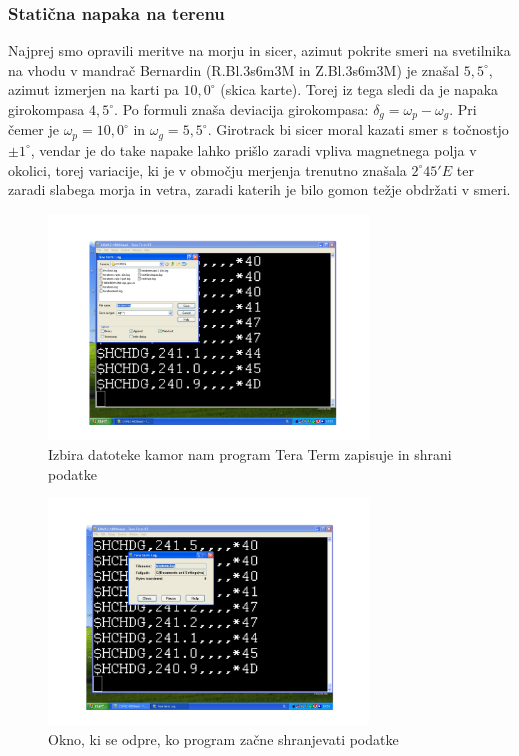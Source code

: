 \subsubsection{Statična napaka na terenu}
Najprej smo opravili meritve na morju in sicer, azimut pokrite smeri na svetilnika na vhodu v mandrač Bernardin (R.Bl.3s6m3M in Z.Bl.3s6m3M) je znašal $5,5^{\circ}$, azimut izmerjen na karti pa $10,0^{\circ}$ (skica karte). Torej iz tega sledi da je napaka girokompasa $4,5^{\circ}$. Po formuli znaša deviacija girokompasa: $\delta_g = \omega_p - \omega_g$. Pri čemer je $\omega_p = 10,0^{\circ}$ in $\omega_g = 5,5^{\circ}$.
Girotrack bi sicer moral kazati smer s točnostjo $\pm 1^{\circ}$, vendar je do take napake lahko prišlo zaradi vpliva magnetnega polja v okolici, torej variacije, ki je v območju merjenja trenutno znašala $2^{\circ}45'E$ ter zaradi slabega morja in vetra, zaradi katerih je bilo gomon težje obdržati v smeri.

\begin{figure}
	\centering
	\includegraphics[height=6cm]{IzbiraDatoteke}
	\caption{Izbira datoteke kamor nam program Tera Term zapisuje in shrani podatke}
	\label{fig:TT_datotek}       %
\end{figure}

\begin{figure}
	\centering
	\includegraphics[height=6cm]{ShranDatoteke}
	\caption{Okno, ki se odpre, ko program začne shranjevati podatke}
	\label{fig:TT_shran}       %
\end{figure}

